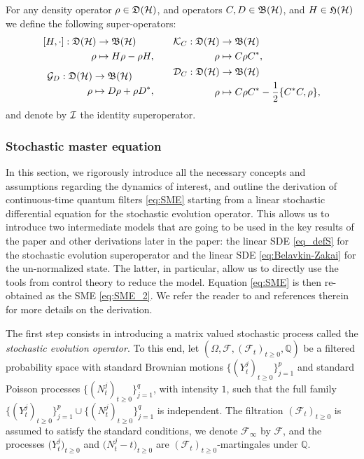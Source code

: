 \documentclass[aihp,12pt]{imsart}
\begin{document}
For any density operator $\rho\in\mathfrak{D}(\mathcal{H})$, and operators $C, D\in\mathfrak{B}(\mathcal{H})$, and $H\in\mathfrak{H}(\mathcal{H})$ we define the following super-operators: 
\begin{align}
\begin{aligned}
\begin{split}
    [H,\cdot]: \mathfrak{D}(\mathcal{H}) &\to \mathfrak{B}(\mathcal{H})\\ \rho&\mapsto H\rho -\rho H,
\end{split}\qquad
&\begin{split}
    \mathcal{K}_C: \mathfrak{D}(\mathcal{H}) &\to \mathfrak{B}(\mathcal{H})\\ \rho&\mapsto C\rho C^*,
\end{split}\\
\begin{split}
    \mathcal{G}_{D}: \mathfrak{D}(\mathcal{H}) &\to \mathfrak{B}(\mathcal{H})\\ \rho&\mapsto D\rho + \rho D^*,
\end{split}\qquad
&\begin{split}
    \mathcal{D}_C: \mathfrak{D}(\mathcal{H}) &\to \mathfrak{B}(\mathcal{H})\\ \rho&\mapsto C\rho C^* - \frac{1}{2}\{C^* C, \rho\},
\end{split}
\end{aligned}
\label{eq:fundamental_super_operators}
\end{align}
and denote by $\mathcal{I}$ the identity superoperator. 

\subsubsection{Stochastic master equation}
In this section,  we rigorously introduce all the necessary concepts and assumptions regarding the dynamics of interest, and outline the derivation of continuous-time quantum filters \eqref{eq:SME} starting from a linear stochastic differential equation for the stochastic evolution operator. This allows us to introduce two intermediate models that are going to be used in the key results of the paper and other derivations later in the paper: the linear SDE \eqref{eq_defS} for the stochastic evolution superoperator and the linear SDE \eqref{eq:Belavkin-Zakai} for the un-normalized state. The latter, in particular, allow us to directly use the tools from control theory to reduce the model. Equation \eqref{eq:SME} is then re-obtained as the SME \eqref{eq:SME_2}. We refer the reader to \cite{barchielliholevo,barchielli2009quantum,Benoist2021} and references therein for more details on the derivation. 

The first step consists in introducing a matrix valued stochastic process called the \emph{stochastic evolution operator}. To this end, let $(\Omega,\mathcal F,(\mathcal F_t)_{t\geq0},\mathbb Q)$ be a filtered probability space with standard Brownian motions $\{(Y_t^j)_{t\geq0}\}_{j=1}^p$ and standard Poisson processes  $\{(N_t^j)_{t\geq0}\}_{j=1}^q$, with intensity $1$, such that the full family $\{(Y_t^j)_{t\geq0}\}_{j=1}^p\cup\{(N_t^j)_{t\geq0}\}_{j=1}^q$ is independent. The filtration $(\mathcal F_t)_{t\geq0}$ is assumed to satisfy the standard conditions, we denote $\mathcal F_{\infty}$ by $\mathcal F$, and the processes $\big(Y_t^j\big)_{t\geq0}$ and $\big(N_t^j-t\big)_{t\geq0}$ are $(\mathcal F_t)_{t\geq0}$-martingales under $\mathbb Q$. 
\end{document}
